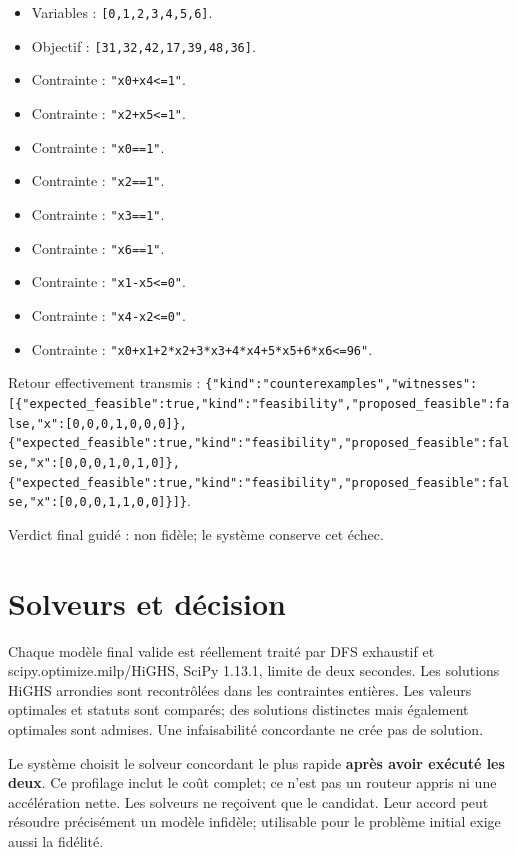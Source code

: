 \documentclass[11pt]{article}
\begin{document}
\begin{itemize}
\item Variables : \texttt{[0,1,2,3,4,5,6]}.
\item Objectif : \texttt{[31,32,42,17,39,48,36]}.
\item Contrainte : \texttt{"x0+x4<=1"}.
\item Contrainte : \texttt{"x2+x5<=1"}.
\item Contrainte : \texttt{"x0==1"}.
\item Contrainte : \texttt{"x2==1"}.
\item Contrainte : \texttt{"x3==1"}.
\item Contrainte : \texttt{"x6==1"}.
\item Contrainte : \texttt{"x1-x5<=0"}.
\item Contrainte : \texttt{"x4-x2<=0"}.
\item Contrainte : \texttt{"x0+x1+2*x2+3*x3+4*x4+5*x5+6*x6<=96"}.
\end{itemize}

Retour effectivement transmis : \texttt{\{"kind":"counterexamples","witnesses":[\{"expected\_feasible":true,"kind":"feasibility","proposed\_feasible":false,"x":[0,0,0,1,0,0,0]\},\{"expected\_feasible":true,"kind":"feasibility","proposed\_feasible":false,"x":[0,0,0,1,0,1,0]\},\{"expected\_feasible":true,"kind":"feasibility","proposed\_feasible":false,"x":[0,0,0,1,1,0,0]\}]\}}.

Verdict final guidé : non fidèle; le système conserve cet échec.

\section{Solveurs et décision}

Chaque modèle final valide est réellement traité par DFS exhaustif et scipy.optimize.milp/HiGHS, SciPy 1.13.1, limite de deux secondes. Les solutions HiGHS arrondies sont recontrôlées dans les contraintes entières. Les valeurs optimales et statuts sont comparés; des solutions distinctes mais également optimales sont admises. Une infaisabilité concordante ne crée pas de solution.

Le système choisit le solveur concordant le plus rapide \textbf{après avoir exécuté les deux}. Ce profilage inclut le coût complet; ce n'est pas un routeur appris ni une accélération nette. Les solveurs ne reçoivent que le candidat. Leur accord peut résoudre précisément un modèle infidèle; utilisable pour le problème initial exige aussi la fidélité.
\end{document}
